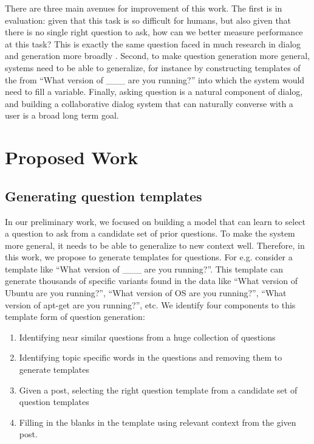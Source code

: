 \documentclass[11pt]{article}
\begin{document}
There are three main avenues for improvement of this work.
The first is in evaluation: given that this task is so difficult for humans, but also given that there is no single right question to ask, how can we better measure performance at this task?
This is exactly the same question faced in much research in dialog and generation more broadly \cite{paek2001empirical,lowe2015ubuntu,liu2016not,kannan2017adversarial}.
Second, to make question generation more general, systems need to be able to generalize, for instance by constructing templates of the from ``What version of \_\_\_ are you running?'' into which the system would need to fill a variable. Finally, asking question is a natural component of dialog, and building a collaborative dialog system that can naturally converse with a user is a broad long term goal.

\section{Proposed Work}

\subsection{Generating question templates}

In our preliminary work, we focused on building a model that can learn to select a question to ask from a candidate set of prior questions. To make the system more general, it needs to be able to generalize to new context well. Therefore, in this work, we propose to generate templates for questions. For e.g. consider a template like ``What version of \_\_\_  are you running?''. This template can generate thousands of specific variants found in the data like ``What version of Ubuntu are you running?'', ``What version of OS are you running?'', ``What version of apt-get are you running?'', etc. We identify four components to this template form of question generation:
\begin{enumerate}
\item Identifying near similar questions from a huge collection of questions
\item Identifying topic specific words in the questions and removing them to generate templates
\item Given a post, selecting the right question template from a candidate set of question templates
\item Filling in the blanks in the template using relevant context from the given post.
\end{enumerate}
\end{document}
